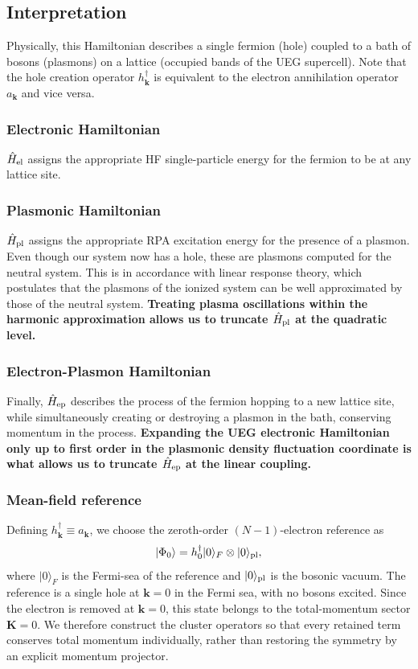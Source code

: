 \subsection{Interpretation}
Physically, this Hamiltonian describes a single fermion (hole) coupled to a bath of bosons (plasmons) on a lattice (occupied bands of the UEG supercell). Note that the hole creation operator $h_{\bm{k}}^{\dagger}$ is equivalent to the electron annihilation operator $a_{\bm{k}}$ and vice versa.
%
\subsubsection{Electronic Hamiltonian}
 $\hat{H}_{\rm el}$ assigns the appropriate HF single-particle energy for the fermion to be at any lattice site.
\subsubsection{Plasmonic Hamiltonian}
 $\hat{H}_{\rm pl}$ assigns the appropriate RPA excitation energy for the presence of a plasmon. Even though our system now has a hole, these are plasmons computed for the neutral system. This is in accordance with linear response theory, which postulates that the plasmons of the ionized system can be well approximated by those of the neutral system. \textbf{Treating plasma oscillations within the harmonic approximation allows us to truncate $\hat{H}_{\rm pl}$ at the quadratic level.}
\subsubsection{Electron-Plasmon Hamiltonian}
Finally, $\hat{H}_{\rm ep}$ describes the process of the fermion hopping to a new lattice site, while simultaneously creating or destroying a plasmon in the bath, conserving momentum in the process. \textbf{Expanding the UEG electronic Hamiltonian only up to first order in the plasmonic density fluctuation coordinate is what allows us to truncate $\hat{H}_{\rm ep}$ at the linear coupling.}
\subsubsection{Mean-field reference}
Defining $h_{\bm{k}}^{\dagger} \equiv a_{\bm{k}}$, we choose the
zeroth-order $(N-1)$-electron reference as
\begin{equation}
    |\Phi_0\rangle
    =
    h_{0}^{\dagger}|0\rangle_F
    \otimes
    |0\rangle_{\rm pl},
\end{equation}
where $|0\rangle_F$ is the Fermi-sea of the reference and
$|0\rangle_{\rm pl}$ is the bosonic vacuum. 
%
The reference is a single hole at $\bm{k}=0$ in the Fermi sea, with no bosons excited.
Since the electron is removed at $\bm{k}=0$, this state belongs to
the total-momentum sector $\bm{K}=0$. We therefore construct the
cluster operators so that every retained term conserves total
momentum individually, rather than restoring the symmetry by an
explicit momentum projector.
%
